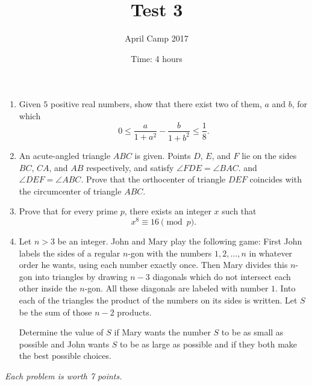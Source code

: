 \documentclass[a4paper,12pt]{article}
\title{Test 3}
\date{Time: 4 hours}
\author{April Camp 2017}
\begin{document}
 \maketitle

\begin{enumerate}
	\item %
	Given $5$ positive real numbers, show that there exist two of them,
	$a$ and $b$, for which
	\[
		0 \leq \frac{a}{1+a^2} - \frac{b}{1+b^2} \leq \frac{1}{8}.
	\]

	\item %
	An acute-angled triangle $ABC$ is given. Points $D$, $E$, and $F$ lie
	on the sides $BC$, $CA$, and $AB$ respectively, and satisfy $\angle
	FDE = \angle BAC$. and $\angle DEF = \angle ABC$. Prove that the
	orthocenter of triangle $DEF$ coincides with the circumcenter of
	triangle $ABC$.

	\item 
	Prove that for every prime $p$, there exists an integer $x$ such that \[x^8 \equiv 16 \pmod p.\]

	\item %
	Let $n > 3$ be an integer. John and Mary play the following game: First John labels the sides of a regular $n$-gon with the numbers $1, 2, \dots, n$ in whatever order he wants, using each number exactly once. Then Mary divides this $n$-gon into triangles by drawing $n - 3$ diagonals which do not intersect each other inside the $n$-gon. All these diagonals are labeled with number $1$. Into each of the triangles the product of the numbers on its sides is written. Let $S$ be the sum of those $n - 2$ products.
	
Determine the value of $S$ if Mary wants the number $S$ to be as small as possible and John wants $S$ to be as large as possible and if they both make the best possible choices.

\end{enumerate}

\medskip 

\hfill \emph{Each problem is worth 7 points.}
	
\end{document}
